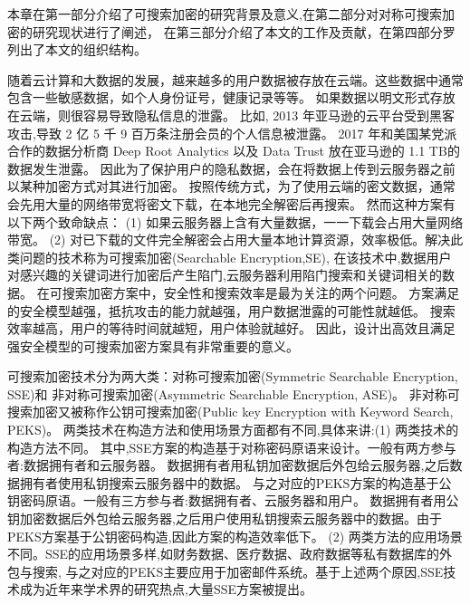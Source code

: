 

本章在第一部分介绍了可搜索加密的研究背景及意义,在第二部分对对称可搜索加密的研究现状进行了阐述，
在第三部分介绍了本文的工作及贡献，在第四部分罗列出了本文的组织结构。



随着云计算和大数据的发展，越来越多的用户数据被存放在云端。这些数据中通常包含一些敏感数据，如个人身份证号，健康记录等等。
如果数据以明文形式存放在云端，则很容易导致隐私信息的泄露。
比如, 2013 年亚马逊的云平台受到黑客攻击,导致 2 亿 5 千 9 百万条注册会员的个人信息被泄露。
2017 年和美国某党派合作的数据分析商 Deep Root Analytics 以及 Data Trust 放在亚马逊的 1.1 TB的数据发生泄露。
因此为了保护用户的隐私数据，会在将数据上传到云服务器之前以某种加密方式对其进行加密。
按照传统方式，为了使用云端的密文数据，通常会先用大量的网络带宽将密文下载，在本地完全解密后再搜索。
然而这种方案有以下两个致命缺点：
(1) 如果云服务器上含有大量数据，一一下载会占用大量网络带宽。 
(2) 对已下载的文件完全解密会占用大量本地计算资源，效率极低。解决此类问题的技术称为可搜索加密(Searchable Encryption,SE),
在该技术中,数据用户对感兴趣的关键词进行加密后产生陷门,云服务器利用陷门搜索和关键词相关的数据。
在可搜索加密方案中，安全性和搜索效率是最为关注的两个问题。
方案满足的安全模型越强，抵抗攻击的能力就越强，用户数据泄露的可能性就越低。
搜索效率越高，用户的等待时间就越短，用户体验就越好。
因此，设计出高效且满足强安全模型的可搜索加密方案具有非常重要的意义。


可搜索加密技术分为两大类：对称可搜索加密(Symmetric Searchable Encryption, SSE)和
非对称可搜索加密(Asymmetric Searchable Encryption, ASE)。
非对称可搜索加密又被称作公钥可搜索加密(Public key Encryption with Keyword Search, PEKS)。
两类技术在构造方法和使用场景方面都有不同,具体来讲:(1) 两类技术的构造方法不同。
其中,SSE方案的构造基于对称密码原语来设计。一般有两方参与者:数据拥有者和云服务器。
数据拥有者用私钥加密数据后外包给云服务器,之后数据拥有者使用私钥搜索云服务器中的数据。
与之对应的PEKS方案的构造基于公钥密码原语。一般有三方参与者:数据拥有者、云服务器和用户。
数据拥有者用公钥加密数据后外包给云服务器,之后用户使用私钥搜索云服务器中的数据。由于PEKS方案基于公钥密码构造,因此方案的构造效率低下。
(2) 两类方法的应用场景不同。SSE的应用场景多样,如财务数据、医疗数据、政府数据等私有数据库的外包与搜索,
与之对应的PEKS主要应用于加密邮件系统。基于上述两个原因,SSE技术成为近年来学术界的研究热点,大量SSE方案被提出。

